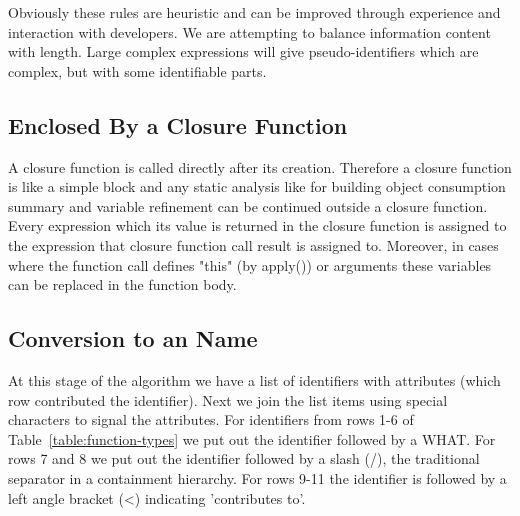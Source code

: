 \documentclass[10pt, preprint]{sigplanconf}
\begin{document}
{Obviously these rules are heuristic and can be improved through experience and interaction with developers. We are attempting to balance information content with length. Large complex expressions will give pseudo-identifiers which are complex, but with some identifiable parts.



\begin{table}
\centering
{}
\caption{JavaScript Expression Reduction to a Name. Expressions which match an entry in the pattern column are converted as shown in the Name column. Here \texttt{e} indicates an expression, \texttt{id} indicates an identifier, \texttt{+} means string concatenation and \texttt{Name()} means we apply the pattern matching recursively.}
\label{expression-reduction} 
\end{table}    

\subsection{Enclosed By a Closure Function}
A closure function is called directly after its creation. Therefore a closure function is like a simple block and any static analysis like
for building object consumption summary and variable refinement can be continued outside a closure function. Every expression which its value
is returned in the closure function is assigned to the expression that closure function call result is assigned to. Moreover, in cases where the
function call defines "this" (by apply()) or arguments these variables can be replaced in the function body.

\subsection{Conversion to an Name}
At this stage of the algorithm we have a list of identifiers with attributes (which row contributed the identifier). Next we join the list items using special characters to signal the attributes. For identifiers from rows 1-6 of Table~\ref{table:function-types} we put out the identifier followed by a WHAT. For rows 7 and 8 we put out the identifier followed by a slash (/), the traditional separator in a containment hierarchy. For rows 9-11 the identifier is followed by a left angle bracket (<) indicating 'contributes to'. 

}
\end{document}

